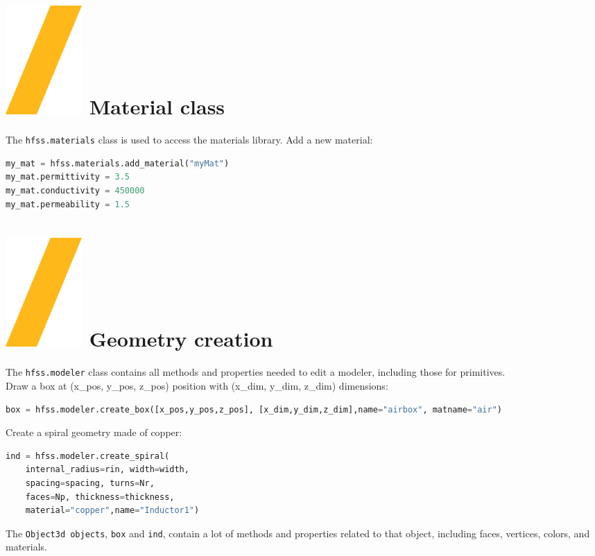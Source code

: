 \documentclass[9pt,landscape]{article}
\begin{document}
\begin{multicols}{3}
\section{\includegraphics[height=\fontcharht\font`\S]{slash.png} Material class}
The \texttt{hfss.materials} class is used to access the materials library.
\newline
Add a new material: 
\begin{lstlisting}[language=Python]
my_mat = hfss.materials.add_material("myMat")
my_mat.permittivity = 3.5
my_mat.conductivity = 450000
my_mat.permeability = 1.5
\end{lstlisting}

\section{\includegraphics[height=\fontcharht\font`\S]{slash.png} Geometry creation}
The \texttt{hfss.modeler} class contains all methods and properties needed to edit a modeler, including those for primitives.
\newline
\\
Draw a box at (x\_pos, y\_pos, z\_pos) position with (x\_dim, y\_dim, z\_dim) dimensions:
\begin{lstlisting}[language=Python]
box = hfss.modeler.create_box([x_pos,y_pos,z_pos], [x_dim,y_dim,z_dim],name="airbox", matname="air")
\end{lstlisting}
Create a spiral geometry made of copper:
\begin{lstlisting}[language=Python]
ind = hfss.modeler.create_spiral(
	internal_radius=rin, width=width,
	spacing=spacing, turns=Nr,
	faces=Np, thickness=thickness,
	material="copper",name="Inductor1")
\end{lstlisting}
\columnbreak
The \texttt{Object3d objects}, \texttt{box} and \texttt{ind}, contain a lot of methods and properties related to that object, including faces, vertices, colors, and materials.


\end{multicols}
\end{document}
